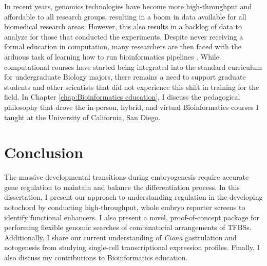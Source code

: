 \begin{dissertationintroduction}
    In recent years, genomics technologies have become more high-throughput and affordable to all research groups, resulting in a boom in data available for all biomedical research areas. However, this also results in a backlog of data to analyze for those that conducted the experiments. Despite never receiving a formal education in computation, many researchers are then faced with the arduous task of learning how to run bioinformatics pipelines \cite{barone2017, stephens2015}. While computational courses have started being integrated into the standard curriculum for undergraduate Biology majors, there remains a need to support graduate students and other scientists that did not experience this shift in training for the field. In Chapter \ref{chap:Bioinformatics education}, I discuss the pedagogical philosophy that drove the in-person, hybrid, and virtual Bioinformatics courses I taught at the University of California, San Diego. 

    \section{Conclusion}

    The massive developmental transitions during embryogenesis require accurate gene regulation to maintain and balance the differentiation process. In this dissertation, I present our approach to understanding regulation in the developing notochord by conducting high-throughput, whole embryo reporter screens to identify functional enhancers. I also present a novel, proof-of-concept package for performing flexible genomic searches of combinatorial arrangements of TFBSs. Additionally, I share our current understanding of \textit{Ciona} gastrulation and notogenesis from studying single-cell transcriptional expression profiles. Finally, I also discuss my contributions to Bioinformatics education.
    
\end{dissertationintroduction}
